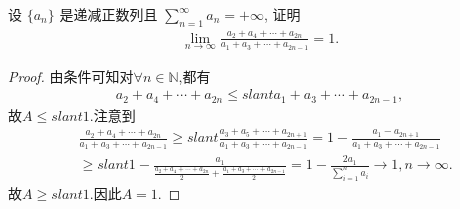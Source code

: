 \documentclass[../../main.tex]{subfiles}
\begin{document}
\begin{example}
设 $\{a_n\}$ 是递减正数列且 $\sum\limits_{n=1}^{\infty}a_n = +\infty$, 证明
\begin{align*}
\lim_{n\rightarrow \infty}\frac{a_2+a_4+\cdots +a_{2n}}{a_1+a_3+\cdots +a_{2n-1}} = 1.
\end{align*}
\end{example}
\begin{proof}
由条件可知对$\forall n\in \mathbb{N}$,都有
\begin{align*}
a_2+a_4+\cdots +a_{2n}\leqslant slant a_1+a_3+\cdots +a_{2n-1},
\end{align*}
故$A\leqslant slant 1$.注意到
\begin{align*}
&\frac{a_2+a_4+\cdots +a_{2n}}{a_1+a_3+\cdots +a_{2n-1}}\geqslant slant \frac{a_3+a_5+\cdots +a_{2n+1}}{a_1+a_3+\cdots +a_{2n-1}}=1-\frac{a_1-a_{2n+1}}{a_1+a_3+\cdots +a_{2n-1}}
\\
&\geqslant slant 1-\frac{a_1}{\frac{a_2+a_4+\cdots +a_{2n}}{2}+\frac{a_1+a_3+\cdots +a_{2n-1}}{2}}=1-\frac{2a_1}{\sum\limits_{i=1}^n{a_i}}\rightarrow 1,n\rightarrow \infty .
\end{align*}
故$A\geqslant slant 1$.因此$A=1$.
\end{proof}
\end{document}
